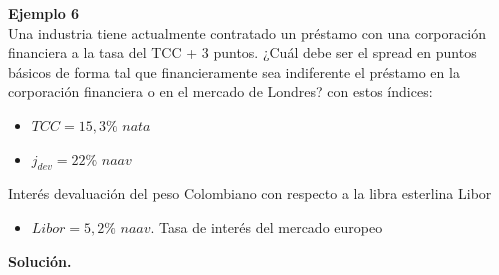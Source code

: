 \textbf{Ejemplo 6}\\
Una industria tiene actualmente contratado un préstamo con una corporación financiera a la tasa del TCC + 3 puntos. ¿Cuál debe ser el spread en puntos básicos de forma tal que financieramente sea indiferente el préstamo en la corporación financiera o en el mercado de Londres? con estos índices:

\begin{itemize}
	\item $TCC = 15,3\% \textit{ nata}$
	\item $j_{dev} = 22\% \textit{ naav}$
\end{itemize}

Interés devaluación del peso Colombiano con respecto a la libra esterlina Libor

\begin{itemize}
	\item $Libor= 5,2\% \textit{ naav}$. Tasa de interés del mercado europeo
\end{itemize}

\textbf{Solución.}

\renewcommand{\arraystretch}{1.5} %

